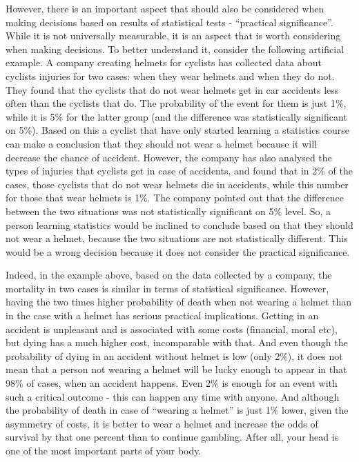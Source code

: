 \documentclass[
]{book}
\theoremstyle{definition}
\theoremstyle{definition}
\theoremstyle{definition}
\theoremstyle{definition}
\theoremstyle{remark}
\begin{document}
However, there is an important aspect that should also be considered when making decisions based on results of statistical tests - ``practical significance''. While it is not universally measurable, it is an aspect that is worth considering when making decisions. To better understand it, consider the following artificial example. A company creating helmets for cyclists has collected data about cyclists injuries for two cases: when they wear helmets and when they do not. They found that the cyclists that do not wear helmets get in car accidents less often than the cyclists that do. The probability of the event for them is just 1\%, while it is 5\% for the latter group (and the difference was statistically significant on 5\%). Based on this a cyclist that have only started learning a statistics course can make a conclusion that they should not wear a helmet because it will decrease the chance of accident. However, the company has also analysed the types of injuries that cyclists get in case of accidents, and found that in 2\% of the cases, those cyclists that do not wear helmets die in accidents, while this number for those that wear helmets is 1\%. The company pointed out that the difference between the two situations was not statistically significant on 5\% level. So, a person learning statistics would be inclined to conclude based on that they should not wear a helmet, because the two situations are not statistically different. This would be a wrong decision because it does not consider the practical significance.

Indeed, in the example above, based on the data collected by a company, the mortality in two cases is similar in terms of statistical significance. However, having the two times higher probability of death when not wearing a helmet than in the case with a helmet has serious practical implications. Getting in an accident is unpleasant and is associated with some costs (financial, moral etc), but dying has a much higher cost, incomparable with that. And even though the probability of dying in an accident without helmet is low (only 2\%), it does not mean that a person not wearing a helmet will be lucky enough to appear in that 98\% of cases, when an accident happens. Even 2\% is enough for an event with such a critical outcome - this can happen any time with anyone. And although the probability of death in case of ``wearing a helmet'' is just 1\% lower, given the asymmetry of costs, it is better to wear a helmet and increase the odds of survival by that one percent than to continue gambling. After all, your head is one of the most important parts of your body.
\end{document}
